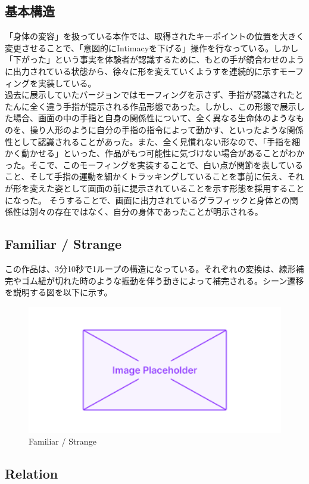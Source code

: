 \subsection{基本構造}
「身体の変容」を扱っている本作では、取得されたキーポイントの位置を大きく変更させることで、「意図的にIntimacyを下げる」操作を行なっている。しかし「下がった」という事実を体験者が認識するために、もとの手が鏡合わせのように出力されている状態から、徐々に形を変えていくようすを連続的に示すモーフィングを実装している。\\
過去に展示していたバージョンではモーフィングを示さず、手指が認識されたとたんに全く違う手指が提示される作品形態であった。しかし、この形態で展示した場合、画面の中の手指と自身の関係性について、全く異なる生命体のようなものを、操り人形のように自分の手指の指令によって動かす、といったような関係性として認識されることがあった。また、全く見慣れない形なので、「手指を細かく動かせる」といった、作品がもつ可能性に気づけない場合があることがわかった。そこで、このモーフィングを実装することで、白い点が関節を表していること、そして手指の運動を細かくトラッキングしていることを事前に伝え、それが形を変えた姿として画面の前に提示されていることを示す形態を採用することになった。
そうすることで、画面に出力されているグラフィックと身体との関係性は別々の存在ではなく、自分の身体であったことが明示される。\\
\subsection{Familiar / Strange}
この作品は、3分10秒で1ループの構造になっている。それぞれの変換は、線形補完やゴム紐が切れた時のような振動を伴う動きによって補完される。シーン遷移を説明する図を以下に示す。
\begin{figure}[H]
  \centering
  \includegraphics[width=15cm]{img/placeholder.png}
  \caption{Familiar / Strange}
  \label{fig:diagram_familiar_strange}
\end{figure}

\subsection{Relation}
